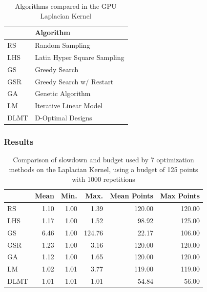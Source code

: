 \documentclass[conference]{IEEEtran}
\begin{document}
\begin{table}[ht]
\caption{Algorithms compared in the GPU Laplacian Kernel}
\centering
\footnotesize
\begin{tabular}{ll}
\toprule
 & Algorithm\\
\midrule
RS & Random Sampling\\
LHS & Latin Hyper Square Sampling\\
GS & Greedy Search\\
GSR & Greedy Search w/ Restart\\
GA & Genetic Algorithm\\
LM & Iterative Linear Model\\
DLMT & D-Optimal Designs\\
\bottomrule
\end{tabular}
\end{table}

\subsubsection{Results}
\label{sec:orgc37160e}
\begin{table}[ht]
\centering
\caption{Comparison of slowdown and budget used by 7 optimization methods on the Laplacian Kernel, using a budget of 125 points with 1000 repetitions}
\begingroup\small
\begin{tabular}{lrrrrr}
  \toprule
 & Mean & Min. & Max. & Mean Points & Max Points \\
  \midrule
RS & 1.10 & 1.00 & 1.39 & 120.00 & 120.00 \\
  LHS & 1.17 & 1.00 & 1.52 & 98.92 & 125.00 \\
  GS & 6.46 & 1.00 & 124.76 & 22.17 & 106.00 \\
  GSR & 1.23 & 1.00 & 3.16 & 120.00 & 120.00 \\
  GA & 1.12 & 1.00 & 1.65 & 120.00 & 120.00 \\
  LM & 1.02 & 1.01 & 3.77 & 119.00 & 119.00 \\
  DLMT & 1.01 & 1.01 & 1.01 & 54.84 & 56.00 \\
   \bottomrule
\end{tabular}
\endgroup
\end{table}
\end{document}
